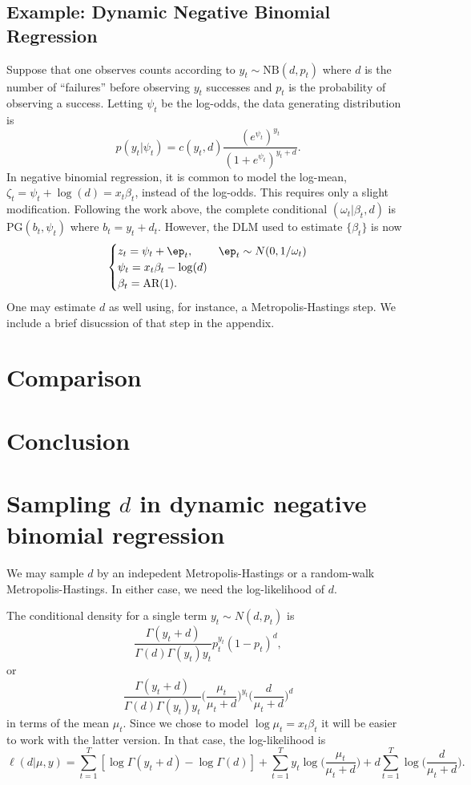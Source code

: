 \documentclass[11pt]{article}
\newcommand{\PG}{\text{PG}}
\newcommand{\NB}{\text{NB}}
\begin{document}
\subsection{Example: Dynamic Negative Binomial Regression}

Suppose that one observes counts according to $y_t \sim \NB(d, p_t)$ where $d$
is the number of ``failures'' before observing $y_t$ successes and $p_t$ is the
probability of observing a success.  Letting $\psi_t$ be the log-odds, the data
generating distribution is
\[
p(y_t | \psi_t) = c(y_t, d) \frac{(e^{\psi_t})^{y_t}}{(1+e^{\psi_t})^{y_t+d}}.
\]
In negative binomial regression, it is common to model the log-mean, $\zeta_t =
\psi_t + \log(d) = x_t \beta_t$, instead of the log-odds.  This requires only a
slight modification.  Following the work above, the complete conditional
$(\omega_t | \beta_t, d)$ is $\PG(b_t, \psi_t)$ where $b_t = y_t + d_t$.
However, the DLM used to estimate $\{\beta_t\}$ is now
\[
\begin{cases}
z_t = \psi_t + \ep_t, & \ep_t \sim N(0, 1/\omega_t) \\
\psi_t = x_t \beta_t - \log(d) \\
\beta_t = \text{AR}(1).
\end{cases}
\]
One may estimate $d$ as well using, for instance, a Metropolis-Hastings step.
We include a brief disucssion of that step in the appendix.

\section{Comparison}



\section{Conclusion}

\appendix

\section{Sampling $d$ in dynamic negative binomial regression}

We may sample $d$ by an indepedent Metropolis-Hastings or a random-walk
Metropolis-Hastings.  In either case, we need the log-likelihood of $d$.

The conditional density for a single term $y_t \sim N(d, p_t)$ is
\[
\frac{\Gamma(y_t + d)}{\Gamma(d) \Gamma(y_t) y_t} p_t^{y_t} (1-p_t)^{d} ,
\]
or 
\[
\frac{\Gamma(y_t + d)}{\Gamma(d) \Gamma(y_t) y_t} 
\Big( \frac{\mu_t}{\mu_t + d} \Big)^{y_t} \Big( \frac{d}{\mu_t + d} \Big)^d
\]
in terms of the mean $\mu_t$.  Since we chose to model $\log \mu_t = x_t
\beta_t$ it will be easier to work with the latter version.  In that case, the
log-likelihood is
\[
\ell(d|\mu, y) = \sum_{t=1}^T [ \log \Gamma(y_t + d)  - \log \Gamma(d) ]  + 
\sum_{t=1}^T y_t \log \big( \frac{\mu_t}{\mu_t + d} \Big) +
d \sum_{t=1}^T \log \Big( \frac{d}{\mu_t + d} \Big).
\]
\end{document}
